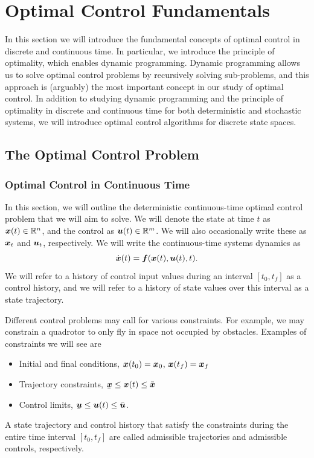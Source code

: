 \chapter{Optimal Control Fundamentals}

In this section we will introduce the fundamental concepts of optimal control in discrete and continuous time. In particular, we introduce the principle of optimality, which enables dynamic programming. Dynamic programming allows us to solve optimal control problems by recursively solving sub-problems, and this approach is (arguably) the most important concept in our study of optimal control. In addition to studying dynamic programming and the principle of optimality in discrete and continuous time for both deterministic and stochastic systems, we will introduce optimal control algorithms for discrete state spaces.

\section{The Optimal Control Problem}

\subsection{Optimal Control in Continuous Time}

In this section, we will outline the deterministic continuous-time optimal control problem that we will aim to solve. We will denote the state at time $t$ as $\bm{x}(t) \in \mathbb{R}^n$, and the control as $\bm{u}(t) \in \mathbb{R}^m$. We will also occasionally write these as $\bm{x}_t$ and $\bm{u}_t$, respectively. We will write the continuous-time systems dynamics as 
\begin{equation}
    \dot{\bm{x}}(t) = \bm{f}(\bm{x}(t),\bm{u}(t),t).
    \label{eq:2_ct_dyn}
\end{equation}
We will refer to a history of control input values during an interval $[t_0,t_f]$ as a control history, and we will refer to a history of state values over this interval as a state trajectory. 

Different control problems may call for various constraints. For example, we may constrain a quadrotor to only fly in space not occupied by obstacles. Examples of constraints we will see are
\begin{itemize}
    \item Initial and final conditions, $\bm{x}(t_0) = \bm{x}_0$, $\bm{x}(t_f) = \bm{x}_f$
    \item Trajectory constraints, $\munderbar{\st} \leq \st(t) \leq \bar{\st}$
    \item Control limits, $\munderbar{\ac} \leq \ac(t) \leq \bar{\ac}$.
\end{itemize}
A state trajectory and control history that satisfy the constraints during the entire time interval $[t_0,t_f]$ are called admissible trajectories and admissible controls, respectively. 

